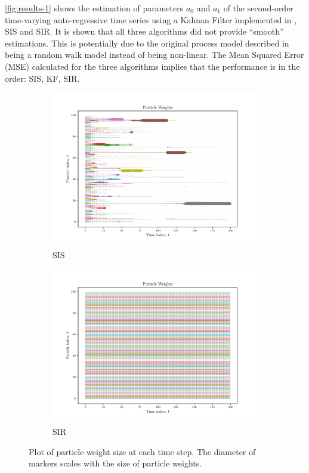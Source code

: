 \documentclass{article}
\begin{document}
\cref{fig:results-1} shows the estimation of parameters $a_0$ and $a_1$ of the second-order time-varying auto-regressive time series using a Kalman Filter implemented in \cite{lab2ans}, SIS and SIR. It is shown that all three algorithms did not provide ``smooth'' estimations. This is potentially due to the original process model described in \cite{lab2} being a random walk model instead of being non-linear. The Mean Squared Error (MSE) calculated for the three algorithms implies that the performance is in the order: SIS, KF, SIR.


\begin{figure}
    \begin{subfigure}{.5\textwidth}
        \includegraphics[width=\textwidth]{Figures/particle_weights_sis.pdf}
        \caption{SIS}
        \label{fig:sis-particle-weights}
    \end{subfigure}
    \begin{subfigure}{.5\textwidth}
        \includegraphics[width=\textwidth]{Figures/particle_weights_sir.pdf}
        \caption{SIR}
        \label{fig:sir-particle-weights}
    \end{subfigure}
    \caption{Plot of particle weight size at each time step. The diameter of markers scales with the size of particle weights.}
    \label{fig:particle-weights}
\end{figure}
\end{document}
